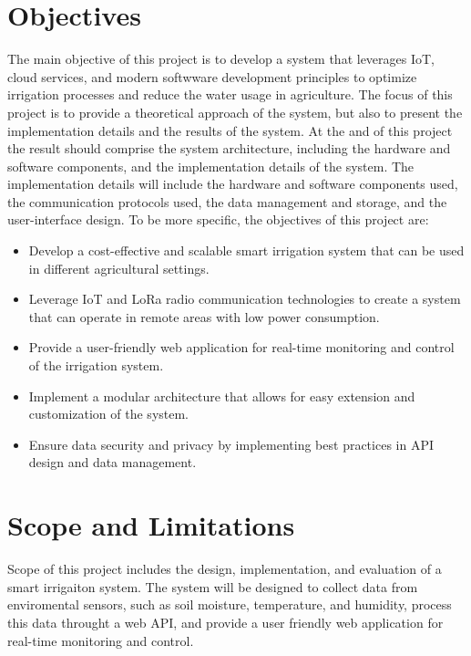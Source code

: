 \section{Objectives}
The main objective of this project is to develop a system that leverages IoT, cloud services, and modern softwware development
principles to optimize irrigation processes and reduce the water usage in agriculture. The focus of this project is to provide
a theoretical approach of the system, but also to present the implementation details and the results of the system. At the and 
of this project the result should comprise the system architecture, including the hardware and software components, and 
the implementation details of the system. The implementation details will include the hardware and software components used,
the communication protocols used, the data management and storage, and the user-interface design.
To be more specific, the objectives of this project are:
\begin{itemize}
    \item Develop a cost-effective and scalable smart irrigation system that can be used in different agricultural settings.
    \item Leverage IoT and LoRa radio communication technologies to create a system that can operate in remote areas with low power consumption.
    \item Provide a user-friendly web application for real-time monitoring and control of the irrigation system.
    \item Implement a modular architecture that allows for easy extension and customization of the system.
    \item Ensure data security and privacy by implementing best practices in API design and data management.
\end{itemize}

\section{Scope and Limitations}

Scope of this project includes the design, implementation, and evaluation of a smart irrigaiton system. 
The system will be designed to collect data from enviromental sensors, such as soil moisture, temperature, and humidity,
process this data throught a web API, and provide a user friendly web application for real-time monitoring and control.

